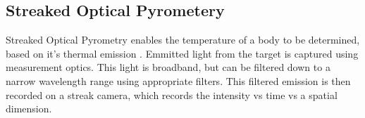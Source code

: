 

\subsection{Streaked Optical Pyrometery} \label{SOP theory}

Streaked Optical Pyrometry enables the temperature of a body to be determined, based on it's thermal emission \cite{Zeldovich1966}. Emmitted light from the target is captured using measurement optics. This light is broadband, but can be filtered down to a narrow wavelength range using appropriate filters. This filtered emission is then recorded on a streak camera, which records the intensity vs time vs a spatial dimension.


